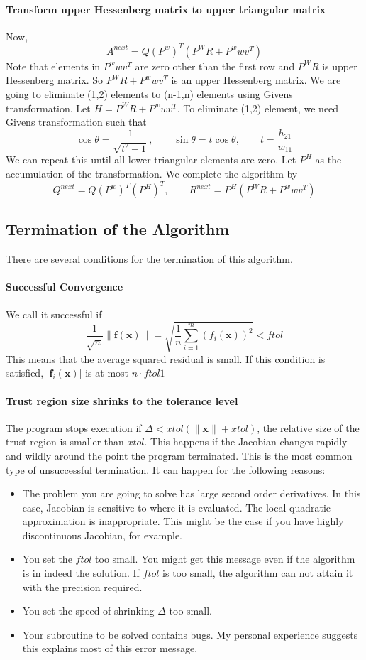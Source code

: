 \documentclass[12pt]{article}
\def\xb{{\mathbf{x}}}
\def\fb{{\mathbf{f}}}
\begin{document}
\paragraph{Transform upper Hessenberg matrix to upper triangular matrix}
Now,
\[
A^{next} = Q (P^w)^T(P^WR+P^wwv^T)
\]
Note that elements in $P^wwv^T$ are zero other than the first row and $P^WR$ is upper Hessenberg
matrix. So $P^WR+P^wwv^T$ is an upper Hessenberg matrix. We are going to eliminate (1,2) elements to
(n-1,n) elements using Givens transformation.  Let $H =P^WR+P^wwv^T$. To eliminate (1,2) element,
we need Givens transformation such that
\[
\cos \theta = \frac{1}{\sqrt{t^2+1}}, \qquad
\sin \theta = t \cos \theta, \qquad t = \frac{h_{21}}{w_{11}}
\]
We can repeat this until all lower triangular elements are zero. Let $P^H$ as the accumulation of
the transformation. We complete the algorithm by 
\[
Q^{next} =  Q (P^w)^T(P^H)^T, \qquad R^{next} = P^H(P^WR+P^wwv^T)
\]




\subsection{Termination of the Algorithm}
There are several conditions for the termination of this algorithm.

\paragraph{Successful Convergence}
 We call it successful if 
\[
\frac{1}{\sqrt{n}}\|\fb(\xb)\|=\sqrt{\frac{1}{n}\sum_{i=1}^m(f_i(\xb))^2} < ftol
\]
This means that the average squared residual is small. If this condition is satisfied, $|\fb_i(\xb)|$
is at most $n\cdot ftol1$

\paragraph{Trust region size shrinks to the tolerance level}
The program stops execution if $\Delta < xtol(\|\xb\|+xtol)$, the relative size of the trust
region is smaller than $xtol$. This happens if the Jacobian changes rapidly and wildly around the
point the program terminated. This is the most common type of unsuccessful termination. It can
happen for the following reasons: 
\begin{itemize}
\item The problem you are going to solve has large second order derivatives. In this case,
  Jacobian is sensitive to where it is evaluated. The local quadratic approximation is inappropriate. This might be the case if you have highly discontinuous Jacobian, for example.
\item You set the $ftol$ too small. You might get this message even if the algorithm is in indeed
  the solution. If $ftol$ is too small, the algorithm can not attain it with the precision
  required.
\item You set the speed of shrinking $\Delta$ too small. 
\item Your subroutine to be solved contains bugs. My personal experience suggests this explains
  most of this error message. 
\end{itemize} 
\end{document}
